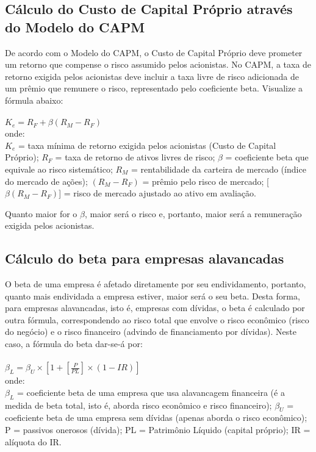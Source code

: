 \documentclass[a4paper,12pt]{article}
\begin{document}
\subsection{Cálculo do Custo de Capital Próprio através do Modelo do CAPM}

De acordo com o Modelo do CAPM, o Custo de Capital Próprio deve prometer um retorno que compense o risco assumido pelos acionistas. No CAPM, a taxa de retorno exigida pelos acionistas deve incluir a taxa livre de risco adicionada de um prêmio que remunere o risco, representado pelo coeficiente beta. Visualize a fórmula abaixo:\\\\

$K_{e} = R_{F} + \beta(R_{M} - R_{F})$\\

onde:\\

$K_{e}$ = taxa mínima de retorno exigida pelos acionistas (Custo de Capital Próprio);
$R_{F}$ = taxa de retorno de ativos livres de risco;
$\beta$ = coeficiente beta que equivale ao risco sistemático;
$R_{M}$ = rentabilidade da carteira de mercado (índice do mercado de ações);
$(R_{M} - R_{F})$ = prêmio pelo risco de mercado;
[$\beta(R_{M} - R_{F})$] = risco de mercado ajustado ao ativo em avaliação.

Quanto maior for o $\beta$, maior será o risco e, portanto, maior será a remuneração exigida pelos acionistas.


\subsection{Cálculo do beta para empresas alavancadas}

O beta de uma empresa é afetado diretamente por seu endividamento, portanto, quanto mais endividada a empresa estiver, maior será o seu beta. Desta forma, para empresas alavancadas, isto é, empresas com dívidas, o beta é calculado por outra fórmula, correspondendo ao risco total que envolve o risco econômico (risco do negócio) e o risco financeiro (advindo de financiamento por dívidas).
Neste caso, a fórmula do beta dar-se-á por:\\\\


$\beta_{L} = \beta_{U} \times [1+[\frac{P}{PL}]\times (1-IR)]$\\

onde:\\

$\beta_{L}$ = coeficiente beta de uma empresa que usa alavancagem financeira (é a medida de beta total, isto é, aborda risco econômico e risco financeiro); $\beta_{U}$ = coeficiente beta de uma empresa sem dívidas (apenas aborda o risco econômico); P = passivos onerosos (dívida); PL = Patrimônio Líquido (capital próprio); IR = alíquota do IR.\\
\end{document}

